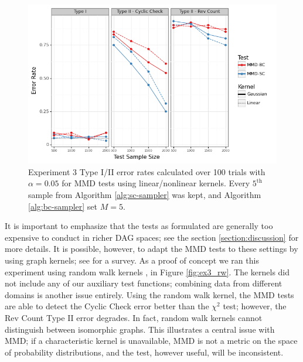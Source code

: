 \documentclass[a4paper,11pt]{article}
\begin{document}
\begin{figure}
    \centering
    \includegraphics[width=\textwidth]{figures/graph_kernel.png}
    \caption{Experiment 3 Type I/II error rates calculated over 100 trials with $\alpha=0.05$ for MMD tests using linear/nonlinear kernels. Every $5^{\text{th}}$ sample from Algorithm \ref{alg:sc-sampler} was kept, and Algorithm \ref{alg:bc-sampler} set $M=5$.}
    \label{fig:ex3_kernel}
\end{figure}

It is important to emphasize that the tests as formulated are generally too expensive to conduct in richer DAG spaces; see the section \ref{section:discussion} for more details. It is possible, however, to adapt the MMD tests to these settings by using graph kernels; see \cite{kriege_survey_2020} for a survey. As a proof of concept we ran this experiment using random walk kernels \cite{gartner_graph_2003}, \cite{vishwanathan_fast_2006} in Figure \ref{fig:ex3_rw}. The kernels did not include any of our auxiliary test functions; combining data from different domains is another issue entirely. Using the random walk kernel, the MMD tests are able to detect the Cyclic Check error better than the $\chi^{2}$ test; however, the Rev Count Type II error degrades. In fact, random walk kernels cannot distinguish between isomorphic graphs. This illustrates a central issue with MMD; if a characteristic kernel is unavailable, MMD is not a metric on the space of probability distributions, and the test, however useful, will be inconsistent.
\end{document}
